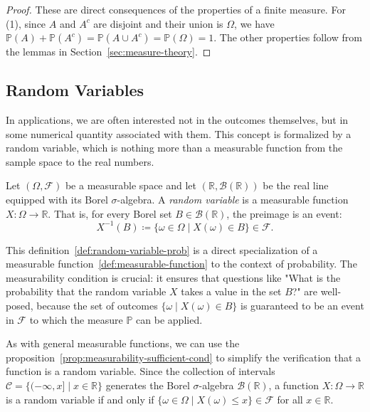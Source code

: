 \begin{proof}

    These are direct consequences of the properties of a finite measure. For (1), since $A$ and $A^c$ are disjoint and their union is $\Omega$, we have $\mathbb{P}(A) + \mathbb{P}(A^c) = \mathbb{P}(A \cup A^c) = \mathbb{P}(\Omega) = 1$. The other properties follow from the lemmas in Section~\ref{sec:measure-theory}.
\end{proof}

\subsection{Random Variables}
In applications, we are often interested not in the outcomes themselves, but in some numerical quantity associated with them. This concept is formalized by a random variable, which is nothing more than a measurable function from the sample space to the real numbers.

\begin{definition}
    \label{def:random-variable-prob}
    Let $(\Omega, \mathcal{F})$ be a measurable space and let $(\mathbb{R}, \mathcal{B}(\mathbb{R}))$ be the real line equipped with its Borel $\sigma$-algebra. A \emph{random variable} is a measurable function $X: \Omega \to \mathbb{R}$. That is, for every Borel set $B \in \mathcal{B}(\mathbb{R})$, the preimage is an event:
    \[
        X^{-1}(B) \coloneq \{\omega \in \Omega \mid X(\omega) \in B\} \in \mathcal{F}.
    \]
\end{definition}

This definition~\ref{def:random-variable-prob} is a direct specialization of a measurable function~\ref{def:measurable-function} to the context of probability. The measurability condition is crucial: it ensures that questions like "What is the probability that the random variable $X$ takes a value in the set $B$?" are well-posed, because the set of outcomes $\{\omega \mid X(\omega) \in B\}$ is guaranteed to be an event in $\mathcal{F}$ to which the measure $\mathbb{P}$ can be applied.

As with general measurable functions, we can use the proposition~\ref{prop:measurability-sufficient-cond} to simplify the verification that a function is a random variable. Since the collection of intervals $\mathcal{C} = \{(-\infty, x] \mid x \in \mathbb{R}\}$ generates the Borel $\sigma$-algebra $\mathcal{B}(\mathbb{R})$, a function $X: \Omega \to \mathbb{R}$ is a random variable if and only if $\{\omega \in \Omega \mid X(\omega) \leq x\} \in \mathcal{F}$ for all $x \in \mathbb{R}$.

